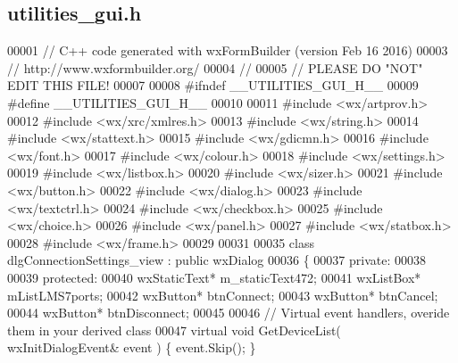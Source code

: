 \subsection{utilities\+\_\+gui.\+h}
\label{utilities__gui_8h_source}

\begin{DoxyCode}
00001 \textcolor{comment}{// C++ code generated with wxFormBuilder (version Feb 16 2016)}
00003 \textcolor{comment}{// http://www.wxformbuilder.org/}
00004 \textcolor{comment}{//}
00005 \textcolor{comment}{// PLEASE DO "NOT" EDIT THIS FILE!}
00007 \textcolor{comment}{}
00008 \textcolor{preprocessor}{#ifndef \_\_UTILITIES\_GUI\_H\_\_}
00009 \textcolor{preprocessor}{#define \_\_UTILITIES\_GUI\_H\_\_}
00010 
00011 \textcolor{preprocessor}{#include <wx/artprov.h>}
00012 \textcolor{preprocessor}{#include <wx/xrc/xmlres.h>}
00013 \textcolor{preprocessor}{#include <wx/string.h>}
00014 \textcolor{preprocessor}{#include <wx/stattext.h>}
00015 \textcolor{preprocessor}{#include <wx/gdicmn.h>}
00016 \textcolor{preprocessor}{#include <wx/font.h>}
00017 \textcolor{preprocessor}{#include <wx/colour.h>}
00018 \textcolor{preprocessor}{#include <wx/settings.h>}
00019 \textcolor{preprocessor}{#include <wx/listbox.h>}
00020 \textcolor{preprocessor}{#include <wx/sizer.h>}
00021 \textcolor{preprocessor}{#include <wx/button.h>}
00022 \textcolor{preprocessor}{#include <wx/dialog.h>}
00023 \textcolor{preprocessor}{#include <wx/textctrl.h>}
00024 \textcolor{preprocessor}{#include <wx/checkbox.h>}
00025 \textcolor{preprocessor}{#include <wx/choice.h>}
00026 \textcolor{preprocessor}{#include <wx/panel.h>}
00027 \textcolor{preprocessor}{#include <wx/statbox.h>}
00028 \textcolor{preprocessor}{#include <wx/frame.h>}
00029 
00031 
00035 \textcolor{keyword}{class }dlgConnectionSettings_view : \textcolor{keyword}{public} wxDialog 
00036 \{
00037     \textcolor{keyword}{private}:
00038     
00039     \textcolor{keyword}{protected}:
00040         wxStaticText* m_staticText472;
00041         wxListBox* mListLMS7ports;
00042         wxButton* btnConnect;
00043         wxButton* btnCancel;
00044         wxButton* btnDisconnect;
00045         
00046         \textcolor{comment}{// Virtual event handlers, overide them in your derived class}
00047         \textcolor{keyword}{virtual} \textcolor{keywordtype}{void} GetDeviceList( wxInitDialogEvent& event ) \{ \textcolor{keyword}{event}.Skip(); \}

\end{DoxyCode}
